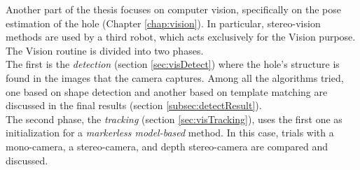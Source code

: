 Another part of the thesis focuses on computer vision, specifically on the pose estimation of the hole (Chapter \ref{chap:vision}). In particular, stereo-vision methods are used by a third robot, which acts exclusively for the Vision purpose.\\
The Vision routine is divided into two phases.\\
The first is the \textit{detection} (section \ref{sec:visDetect}) where the hole's structure is found in the images that the camera captures. Among all the algorithms tried, one based on shape detection and another based on template matching are discussed in the final results (section \ref{subsec:detectResult}).\\
The second phase, the \textit{tracking} (section \ref{sec:visTracking}), uses the first one as initialization for a \textit{markerless model-based} method. In this case, trials with a mono-camera, a stereo-camera, and depth stereo-camera are compared and discussed.
 

